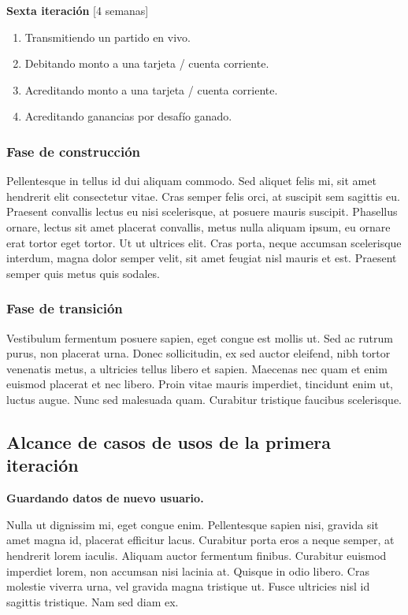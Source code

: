 \documentclass[a4paper, 10pt, twoside]{article}
\begin{document}
\textbf{Sexta iteración} [4 semanas]
\begin{enumerate}
\item Transmitiendo un partido en vivo.
\item Debitando monto a una tarjeta / cuenta corriente.
\item Acreditando monto a una tarjeta / cuenta corriente.
\item Acreditando ganancias por desafío ganado.
\end{enumerate}

\subsubsection{Fase de construcción}
Pellentesque in tellus id dui aliquam commodo. Sed aliquet felis mi, sit amet hendrerit elit consectetur vitae. Cras semper felis orci, at suscipit sem sagittis eu. Praesent convallis lectus eu nisi scelerisque, at posuere mauris suscipit. Phasellus ornare, lectus sit amet placerat convallis, metus nulla aliquam ipsum, eu ornare erat tortor eget tortor. Ut ut ultrices elit. Cras porta, neque accumsan scelerisque interdum, magna dolor semper velit, sit amet feugiat nisl mauris et est. Praesent semper quis metus quis sodales.

\subsubsection{Fase de transición}
Vestibulum fermentum posuere sapien, eget congue est mollis ut. Sed ac rutrum purus, non placerat urna. Donec sollicitudin, ex sed auctor eleifend, nibh tortor venenatis metus, a ultricies tellus libero et sapien. Maecenas nec quam et enim euismod placerat et nec libero. Proin vitae mauris imperdiet, tincidunt enim ut, luctus augue. Nunc sed malesuada quam. Curabitur tristique faucibus scelerisque.

\subsection{Alcance de casos de usos de la primera iteración}
\textbf{Guardando datos de nuevo usuario.}

Nulla ut dignissim mi, eget congue enim. Pellentesque sapien nisi, gravida sit amet magna id, placerat efficitur lacus. Curabitur porta eros a neque semper, at hendrerit lorem iaculis. Aliquam auctor fermentum finibus. Curabitur euismod imperdiet lorem, non accumsan nisi lacinia at. Quisque in odio libero. Cras molestie viverra urna, vel gravida magna tristique ut. Fusce ultricies nisl id sagittis tristique. Nam sed diam ex.
\end{document}
